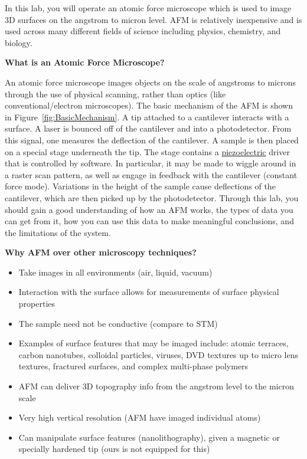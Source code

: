 \documentclass{../lab}
\begin{document}
In this lab, you will operate an atomic force microscope which is used to image 3D surfaces on the angstrom to micron level. AFM is relatively inexpensive and is used across many different fields of science including physics, chemistry, and biology.

\textbf{What is an Atomic Force Microscope?}

An atomic force microscope images objects on the scale of angstroms to microns through the use of physical scanning, rather than optics (like conventional/electron microscopes). The basic mechanism of the AFM is shown in Figure~\ref{fig:BasicMechanism}. A tip attached to a cantilever interacts with a surface. A laser is bounced off of the cantilever and into a photodetector. From this signal, one measures the deflection of the cantilever. A sample is then placed on a special stage underneath the tip. The stage contains a \hyperref[subsubsec:Piezo]{piezoelectric} driver that is controlled by software. In particular, it may be made to wiggle around in a raster scan pattern, as well as engage in feedback with the cantilever (constant force mode). Variations in the height of the sample cause deflections of the cantilever, which are then picked up by the photodetector. Through this lab, you should gain a good understanding of how an AFM works, the types of data you can get from it, how you can use this data to make meaningful conclusions, and the limitations of the system.

\textbf{Why AFM over other microscopy techniques?}
\begin{itemize}
    \item Take images in all environments (air, liquid, vacuum)

    \item Interaction with the surface allows for measurements of surface physical properties

    \item The sample need not be conductive (compare to STM)

    \item Examples of surface features that may be imaged include: atomic terraces, carbon nanotubes, colloidal particles, viruses, DVD textures up to micro lens textures, fractured surfaces, and complex multi-phase polymers

    \item AFM can deliver 3D topography info from the angstrom level to the micron scale

    \item Very high vertical resolution (AFM have imaged individual atoms)

    \item Can manipulate surface features (nanolithography), given a magnetic or specially hardened tip (ours is not equipped for this)

\end{itemize}
\end{document}
